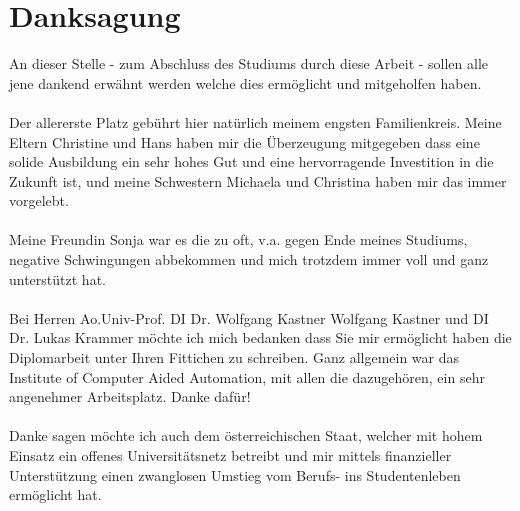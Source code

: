 \chapter*{Danksagung}

An dieser Stelle - zum Abschluss des Studiums durch diese Arbeit - sollen alle jene dankend erwähnt werden welche dies ermöglicht und mitgeholfen haben.
\\
\\
Der allererste Platz gebührt hier natürlich meinem engsten Familienkreis. Meine Eltern Christine und Hans haben mir die Überzeugung mitgegeben dass eine solide Ausbildung ein
sehr hohes Gut und eine hervorragende Investition in die Zukunft ist, und meine Schwestern Michaela und Christina haben mir das immer vorgelebt.
\\
\\
Meine Freundin Sonja war es die zu oft, v.a. gegen Ende meines Studiums, negative Schwingungen abbekommen und mich trotzdem immer voll und ganz unterstützt hat.
\\
\\
Bei Herren Ao.Univ-Prof. DI Dr. Wolfgang Kastner Wolfgang Kastner und DI Dr. Lukas Krammer möchte ich mich bedanken dass Sie mir ermöglicht haben die Diplomarbeit unter Ihren Fittichen
zu schreiben. Ganz allgemein war das Institute of Computer Aided Automation, mit allen die dazugehören, ein sehr angenehmer Arbeitsplatz. Danke dafür!
\\
\\
Danke sagen möchte ich auch dem österreichischen Staat, welcher mit hohem Einsatz ein offenes Universitätsnetz betreibt und mir mittels finanzieller Unterstützung
einen zwanglosen Umstieg vom Berufs- ins Studentenleben ermöglicht hat.
